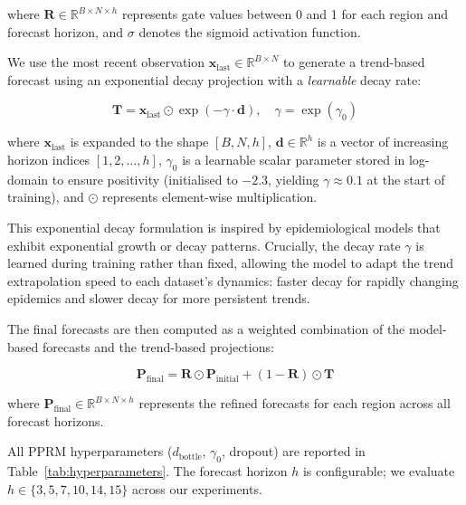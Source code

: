 \documentclass[a4paper,fleqn]{cas-dc}
\begin{document}
where $\mathbf{R} \in \mathbb{R}^{B \times N \times h}$ represents gate values between 0 and 1 for each region and forecast horizon, and $\sigma$ denotes the sigmoid activation function.

We use the most recent observation $\mathbf{x}_{\text{last}} \in \mathbb{R}^{B \times N}$ to generate a trend-based forecast using an exponential decay projection with a \emph{learnable} decay rate:

\begin{equation}
\mathbf{T} = \mathbf{x}_{\text{last}} \odot \exp(-\gamma \cdot \mathbf{d}), \quad \gamma = \exp(\gamma_0)
\end{equation}

where $\mathbf{x}_{\text{last}}$ is expanded to the shape $[B, N, h]$, $\mathbf{d} \in \mathbb{R}^h$ is a vector of increasing horizon indices $[1, 2, \ldots, h]$, $\gamma_0$ is a learnable scalar parameter stored in log-domain to ensure positivity (initialised to $-2.3$, yielding $\gamma \approx 0.1$ at the start of training), and $\odot$ represents element-wise multiplication.

This exponential decay formulation is inspired by epidemiological models that exhibit exponential growth or decay patterns. Crucially, the decay rate $\gamma$ is learned during training rather than fixed, allowing the model to adapt the trend extrapolation speed to each dataset's dynamics: faster decay for rapidly changing epidemics and slower decay for more persistent trends.

The final forecasts are then computed as a weighted combination of the model-based forecasts and the trend-based projections:

\begin{equation}
\mathbf{P}_{\text{final}} = \mathbf{R} \odot \mathbf{P}_{\text{initial}} + (1 - \mathbf{R}) \odot \mathbf{T}
\end{equation}

where $\mathbf{P}_{\text{final}} \in \mathbb{R}^{B \times N \times h}$ represents the refined forecasts for each region across all forecast horizons.

All PPRM hyperparameters ($d_{\text{bottle}}$, $\gamma_0$, dropout) are reported in Table~\ref{tab:hyperparameters}. The forecast horizon $h$ is configurable; we evaluate $h \in \{3, 5, 7, 10, 14, 15\}$ across our experiments.
\end{document}
